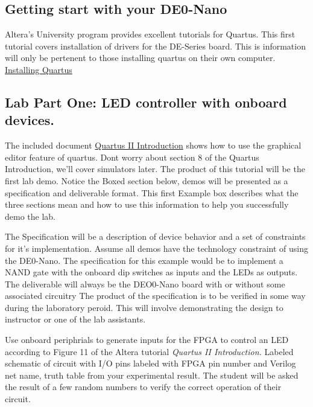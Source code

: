     \subsection{Getting start with your DE0-Nano}
      Altera's University program provides excellent tutorials for Quartus. This first tutorial covers installation of drivers for the DE-Series board. This is information will only be pertenent to those installing quartus on their own computer. \href{http://www.altera.com/literature/manual/quartus_install.pdf}{Installing Quartus} 

    \subsection{Lab Part One: LED controller with onboard devices.}
      The included document \href{ftp://ftp.altera.com/up/pub/Altera_Material/13.0/Tutorials/Schematic/Quartus_II_Introduction.pdf}{Quartus II Introduction} shows how to use the graphical editor feature of quartus. Dont worry about section 8 of the Quartus Introduction, we'll cover simulators later. The product of this tutorial will be the first lab demo. Notice the Boxed section below, demos will be presented as a specification and deliverable format. This first Example box describes what the three sections mean and how to use this information to help you successfully demo the lab.

          {The Specification will be a description of device behavior and a set of constraints for it's implementation. Assume all demos have the technology constraint of using the DE0-Nano. The specification for this example would be to implement a NAND gate with the onboard dip switches as inputs and the LEDs as outputs.}
          {The deliverable will always be the DEO0-Nano board with or without some associated circuitry}
          {The product of the specification is to be verified in some way during the laboratory peroid. This will involve demonstrating the design to instructor or one of the lab assistants.}

          {Use onboard periphrials to generate inputs for the FPGA to control an LED according to Figure 11 of the Altera tutorial {\it Quartus II Introduction.}}
          {Labeled schematic of circuit with I/O pins labeled with FPGA pin number and Verilog net name,  truth table from your  experimental result.}
          {The student will be asked the result of a few random numbers to verify the correct operation of their circuit.}

